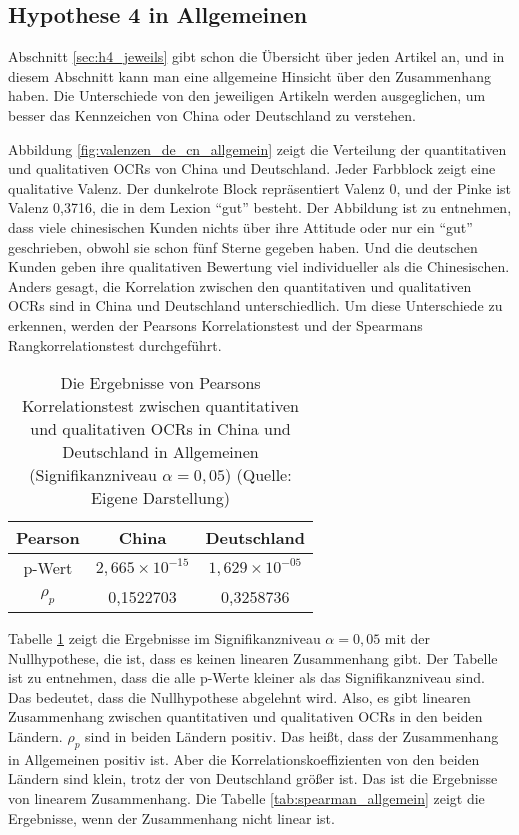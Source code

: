 \subsection{Hypothese 4 in Allgemeinen}
Abschnitt \ref{sec:h4_jeweils} gibt schon die Übersicht über jeden Artikel an, und in diesem Abschnitt kann man eine allgemeine Hinsicht über den Zusammenhang haben. Die Unterschiede von den jeweiligen Artikeln werden ausgeglichen, um besser das Kennzeichen von China oder Deutschland zu verstehen. 

Abbildung \ref{fig:valenzen_de_cn_allgemein} zeigt die Verteilung der quantitativen und qualitativen \ac{OCRs} von China und Deutschland. Jeder Farbblock zeigt eine qualitative Valenz. Der dunkelrote Block repräsentiert Valenz 0, und der Pinke ist Valenz 0,3716, die in dem Lexion ``gut'' besteht. Der Abbildung ist zu entnehmen, dass viele chinesischen Kunden nichts über ihre Attitude oder nur ein ``gut'' geschrieben, obwohl sie schon fünf Sterne gegeben haben. Und die deutschen Kunden geben ihre qualitativen Bewertung viel individueller als die Chinesischen. Anders gesagt, die Korrelation zwischen den quantitativen und qualitativen \ac{OCRs} sind in China und Deutschland unterschiedlich. Um diese Unterschiede zu erkennen, werden der Pearsons Korrelationstest und der Spearmans Rangkorrelationstest durchgeführt.

\begin{table}[h]
\centering
\begin{tabular}{|c|c|c|}
\hline
Pearson & China     & Deutschland \\ \hline
p-Wert  & $2,665 \times 10^{-15}$ & $1,629 \times 10^{-05}$   \\ \hline
${\rho}_p$     & 0,1522703 & 0,3258736   \\ \hline
\end{tabular}
\caption[Die Ergebnisse von Pearsons Korrelationstest zwischen quantitativen und qualitativen OCRs in China und Deutschland in Allgemeinen]{Die Ergebnisse von Pearsons Korrelationstest zwischen quantitativen und qualitativen \ac{OCRs} in China und Deutschland in Allgemeinen (Signifikanzniveau $\alpha = 0,05$) (Quelle: Eigene Darstellung)}
\label{tab:pearson_allgemein}
\end{table}

Tabelle \ref{tab:pearson_allgemein} zeigt die Ergebnisse im Signifikanzniveau $\alpha = 0,05$ mit der Nullhypothese, die ist, dass es keinen linearen Zusammenhang gibt. Der Tabelle ist zu entnehmen, dass die alle p-Werte kleiner als das Signifikanzniveau sind. Das bedeutet, dass die Nullhypothese abgelehnt wird. Also, es gibt linearen Zusammenhang zwischen quantitativen und qualitativen \ac{OCRs} in den beiden Ländern. ${\rho}_p$ sind in beiden Ländern positiv. Das heißt, dass der Zusammenhang in Allgemeinen positiv ist. Aber die Korrelationskoeffizienten von den beiden Ländern sind klein, trotz der von Deutschland größer ist. Das ist die Ergebnisse von linearem Zusammenhang. Die Tabelle \ref{tab:spearman_allgemein} zeigt die Ergebnisse, wenn der Zusammenhang nicht linear ist.

